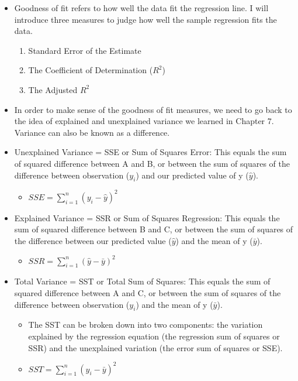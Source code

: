 \documentclass[
  letterpaper,
  DIV=11,
  numbers=noendperiod]{scrreprt}
\providecommand{\tightlist}{%
  \setlength{\itemsep}{0pt}\setlength{\parskip}{0pt}}\usepackage{longtable,booktabs,array}
\begin{document}
\begin{itemize}
\tightlist
\item
  Goodness of fit refers to how well the data fit the regression line. I
  will introduce three measures to judge how well the sample regression
  fits the data.

  \begin{enumerate}
  \def\labelenumi{\arabic{enumi}.}
  \tightlist
  \item
    Standard Error of the Estimate
  \item
    The Coefficient of Determination (\(R^2\))
  \item
    The Adjusted \(R^2\)
  \end{enumerate}
\item
  In order to make sense of the goodness of fit measures, we need to go
  back to the idea of explained and unexplained variance we learned in
  Chapter 7. Variance can also be known as a difference.\\
\item
  Unexplained Variance = SSE or Sum of Squares Error: This equals the
  sum of squared difference between A and B, or between the sum of
  squares of the difference between observation (\(y_i\)) and our
  predicted value of y (\(\hat{y}\)).

  \begin{itemize}
  \tightlist
  \item
    \(SSE = \sum^n_{i=1}(y_i - \hat{y})^2\)
  \end{itemize}
\item
  Explained Variance = SSR or Sum of Squares Regression: This equals the
  sum of squared difference between B and C, or between the sum of
  squares of the difference between our predicted value (\(\hat{y}\))
  and the mean of y (\(\bar{y}\)).

  \begin{itemize}
  \tightlist
  \item
    \(SSR = \sum^n_{i=1}(\hat{y} - \bar{y})^2\)
  \end{itemize}
\item
  Total Variance = SST or Total Sum of Squares: This equals the sum of
  squared difference between A and C, or between the sum of squares of
  the difference between observation (\(y_i\)) and the mean of y
  (\(\bar{y}\)).

  \begin{itemize}
  \tightlist
  \item
    The SST can be broken down into two components: the variation
    explained by the regression equation (the regression sum of squares
    or SSR) and the unexplained variation (the error sum of squares or
    SSE).
  \item
    \(SST = \sum^n_{i=1}(y_i - \bar{y})^2\)
  \end{itemize}
\end{itemize}
\end{document}
